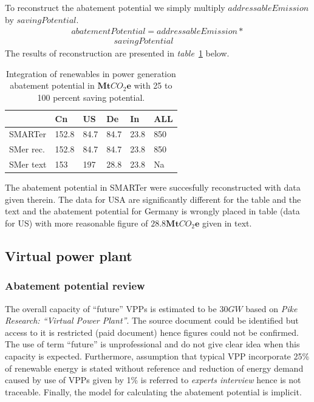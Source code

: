 \documentclass[11pt, twocolumn]{article}
\begin{document}
To reconstruct the abatement potential we simply multiply $addressableEmission$ by $savingPotential$.
\begin{gather*}
  abatementPotential = addressableEmission *\\
  \quad\quad\quad\quad\quad savingPotential
\end{gather*}
The results of reconstruction are presented in \emph{table}~\ref{tab:irpg} below.
\begin{center}
  \begin{table}[h]
    \begin{tabular}{ p{} | p{} | p{} | p{} | p{} | p{} }
       & Cn & US & De & In & ALL \\
      \hline
      SMARTer & 152.8 & 84.7 & 84.7 & 23.8 & 850 \\
      SMer rec. & 152.8 & 84.7 & 84.7 & 23.8 & 850 \\
      SMer text & 153 & 197 & 28.8 & 23.8 & Na
    \end{tabular}
    \caption{Integration of renewables in power generation abatement potential in $\mathbf{Mt}CO_2\mathbf{e}$ with 25 to 100 percent saving potential. \label{tab:irpg}}
  \end{table}
\end{center}
The abatement potential in SMARTer were succesfully reconstructed with data given therein. The data for USA are significantly different for the table and the text and the abatement potential for Germany is wrongly placed in table (data for US) with more reasonable figure of $\mathbf{28.8Mt}CO_2\mathbf{e}$ given in text.


\subsection{Virtual power plant}
\subsubsection{Abatement potential review}
The overall capacity of ``future'' VPPs is estimated to be $30GW$ based on \emph{Pike Research: ``Virtual Power Plant''}. The source document could be identified but access to it is restricted (paid document) hence figures could not be confirmed. The use of term ``future'' is unprofessional and do not give clear idea when this capacity is expected. Furthermore, assumption that typical VPP incorporate 25\% of renewable energy is stated without reference and reduction of energy demand caused by use of VPPs given by 1\% is referred to \emph{experts interview} hence is not traceable. Finally, the model for calculating the abatement potential is implicit.\\
\end{document}
